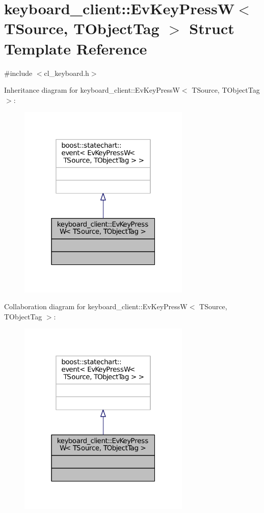 \hypertarget{structkeyboard__client_1_1EvKeyPressW}{}\section{keyboard\+\_\+client\+:\+:Ev\+Key\+PressW$<$ T\+Source, T\+Object\+Tag $>$ Struct Template Reference}
\label{structkeyboard__client_1_1EvKeyPressW}


{\ttfamily \#include $<$cl\+\_\+keyboard.\+h$>$}



Inheritance diagram for keyboard\+\_\+client\+:\+:Ev\+Key\+PressW$<$ T\+Source, T\+Object\+Tag $>$\+:
\nopagebreak
\begin{figure}[H]
\begin{center}
\leavevmode
\includegraphics[width=232pt]{structkeyboard__client_1_1EvKeyPressW__inherit__graph}
\end{center}
\end{figure}


Collaboration diagram for keyboard\+\_\+client\+:\+:Ev\+Key\+PressW$<$ T\+Source, T\+Object\+Tag $>$\+:
\nopagebreak
\begin{figure}[H]
\begin{center}
\leavevmode
\includegraphics[width=232pt]{structkeyboard__client_1_1EvKeyPressW__coll__graph}
\end{center}
\end{figure}


